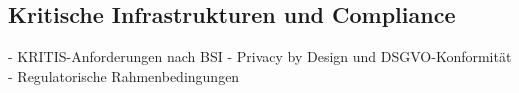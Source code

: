 \subsection{Kritische Infrastrukturen und Compliance} \label{sec:Kritische Infrastrukturen und Compliance}

- KRITIS-Anforderungen nach BSI
- Privacy by Design und DSGVO-Konformität
- Regulatorische Rahmenbedingungen